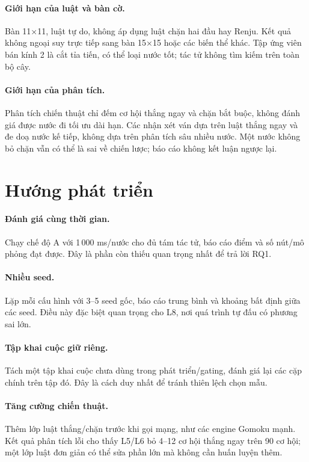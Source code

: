 \paragraph{Giới hạn của luật và bàn cờ.} Bàn 11×11, luật tự do, không áp dụng luật chặn hai đầu
hay Renju. Kết quả không ngoại suy trực tiếp sang bàn 15×15 hoặc các biến thể khác. Tập ứng
viên bán kính 2 là cắt tỉa tiến, có thể loại nước tốt; tác tử không tìm kiếm trên toàn bộ cây.

\paragraph{Giới hạn của phân tích.} Phân tích chiến thuật chỉ đếm cơ hội thắng ngay và chặn bắt
buộc, không đánh giá được nước đi tối ưu dài hạn. Các nhận xét ván dựa trên luật thắng ngay và
đe doạ nước kế tiếp, không dựa trên phân tích sâu nhiều nước. Một nước không bỏ chặn vẫn có
thể là sai về chiến lược; báo cáo không kết luận ngược lại.

\section{Hướng phát triển}
\label{sec:kl-huong}
\paragraph{Đánh giá cùng thời gian.} Chạy chế độ A với 1\,000 ms/nước cho đủ tám tác tử, báo
cáo điểm và số nút/mô phỏng đạt được. Đây là phần còn thiếu quan trọng nhất để trả lời RQ1.

\paragraph{Nhiều seed.} Lặp mỗi cấu hình với 3--5 seed gốc, báo cáo trung bình và khoảng bất
định giữa các seed. Điều này đặc biệt quan trọng cho L8, nơi quá trình tự đấu có phương sai lớn.

\paragraph{Tập khai cuộc giữ riêng.} Tách một tập khai cuộc chưa dùng trong phát triển/gating,
đánh giá lại các cặp chính trên tập đó. Đây là cách duy nhất để tránh thiên lệch chọn mẫu.

\paragraph{Tăng cường chiến thuật.} Thêm lớp luật thắng/chặn trước khi gọi mạng, như các engine
Gomoku mạnh. Kết quả phân tích lỗi cho thấy L5/L6 bỏ 4--12 cơ hội thắng ngay trên 90 cơ hội;
một lớp luật đơn giản có thể sửa phần lớn mà không cần huấn luyện thêm.

